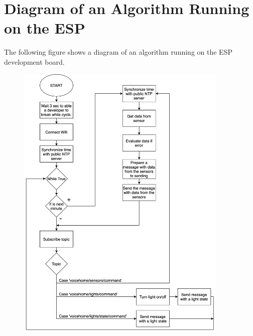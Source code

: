 \chapter{Diagram of an Algorithm Running on the ESP} \label{app:esp}

The following figure shows a diagram of an algorithm running on the ESP development board.

\begin{figure}[H]
    \centering
    \includegraphics[width=0.9\textwidth]{img/esp_diagram.png}
    \label{fig:esp_diagram}
\end{figure}